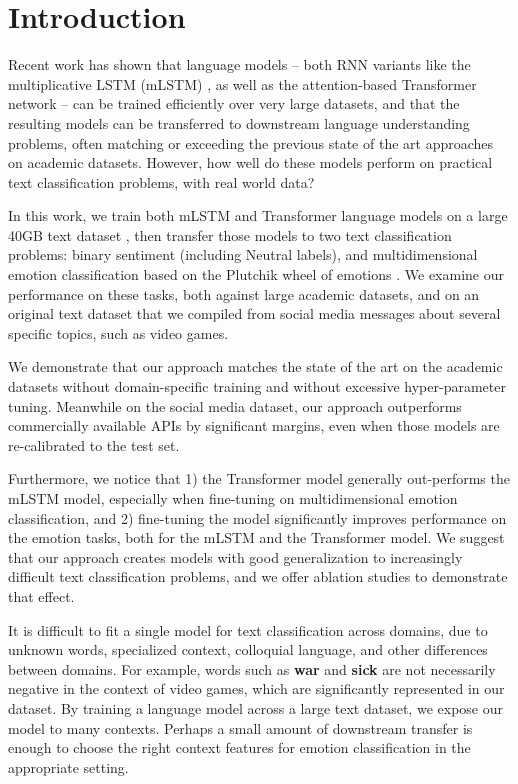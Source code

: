 \documentclass[letterpaper]{article} %
\begin{document}
\section{Introduction}
Recent work has shown that language models -- both RNN variants like the multiplicative LSTM (mLSTM) \protect\cite{Krause2016}, as well as the attention-based Transformer network \protect\cite{Transformer2017} -- can be trained efficiently over very large datasets, and that the resulting models can be transferred to downstream language understanding problems, often matching or exceeding the previous state of the art approaches on academic datasets. However, how well do these models perform on practical text classification problems, with real world data?

In this work, we train both mLSTM and Transformer language models on a large 40GB text dataset \protect\cite{McAuley2015}, then transfer those models to two text classification problems: binary sentiment (including Neutral labels), and multidimensional emotion classification based on the Plutchik wheel of emotions \protect\cite{Plutchik1979}. We examine our performance on these tasks, both against large academic datasets, and on an original text dataset that we compiled from social media messages about several specific topics, such as video games.

We demonstrate that our approach matches the state of the art on the academic datasets without domain-specific training and without excessive hyper-parameter tuning. Meanwhile on the social media dataset, our approach outperforms commercially available APIs by significant margins, even when those models are re-calibrated to the test set.

Furthermore, we notice that 1) the Transformer model generally out-performs the mLSTM model, especially when fine-tuning on multidimensional emotion classification, and 2) fine-tuning the model significantly improves performance on the emotion tasks, both for the mLSTM and the Transformer model. We suggest that our approach creates models with good generalization to increasingly difficult text classification problems, and we offer ablation studies to demonstrate that effect.

It is difficult to fit a single model for text classification across domains, due to unknown words, specialized context, colloquial language, and other differences between domains. For example, words such as \textbf{war} and \textbf{sick} are not necessarily negative in the context of video games, which are significantly represented in our dataset. By training a language model across a large text dataset, we expose our model to many contexts. Perhaps a small amount of downstream transfer is enough to choose the right context features for emotion classification in the appropriate setting.
\end{document}
